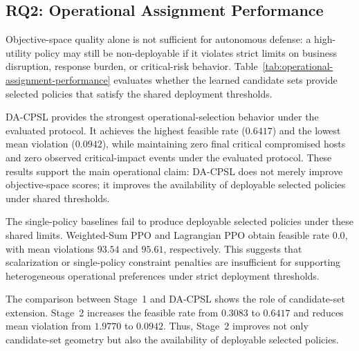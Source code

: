 \documentclass[sigconf,review,anonymous]{acmart}
\begin{document}
\subsection{RQ2: Operational Assignment Performance}
\label{subsec:results-operational-assignment}

Objective-space quality alone is not sufficient for autonomous defense:
a high-utility policy may still be non-deployable if it violates strict
limits on business disruption, response burden, or critical-risk
behavior. Table~\ref{tab:operational-assignment-performance} evaluates
whether the learned candidate sets provide selected policies that satisfy
the shared deployment thresholds.

\begin{table}[t]
\centering
\small
\caption{Operational selection performance under shared deployment thresholds. Feasible rate is the fraction of evaluation rollouts in which the selected policy satisfies the business and cost thresholds; violation measures the mean magnitude of threshold violation.}
\label{tab:operational-assignment-performance}
\resizebox{\textwidth}{!}{%

}
\end{table}

DA-CPSL provides the strongest operational-selection behavior under the
evaluated protocol. It achieves the highest feasible rate (\(0.6417\))
and the lowest mean violation (\(0.0942\)), while maintaining zero final
critical compromised hosts and zero observed critical-impact events under
the evaluated protocol. These results support the main operational claim:
DA-CPSL does not merely improve objective-space scores; it improves the
availability of deployable selected policies under shared thresholds.

The single-policy baselines fail to produce deployable selected policies
under these shared limits. Weighted-Sum PPO and Lagrangian PPO obtain
feasible rate \(0.0\), with mean violations \(93.54\) and \(95.61\),
respectively. This suggests that scalarization or single-policy
constraint penalties are insufficient for supporting heterogeneous
operational preferences under strict deployment thresholds.

The comparison between Stage~1 and DA-CPSL shows the role of
candidate-set extension. Stage~2 increases the feasible rate from
\(0.3083\) to \(0.6417\) and reduces mean violation from \(1.9770\) to
\(0.0942\). Thus, Stage~2 improves not only candidate-set geometry but
also the availability of deployable selected policies.
\end{document}

